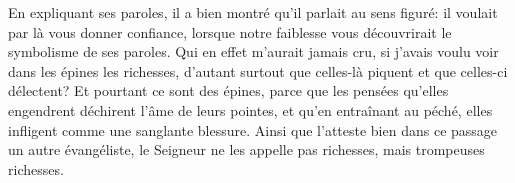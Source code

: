 En expliquant ses paroles, il a bien montré qu'il parlait au sens figuré:
	il voulait par là vous donner confiance,
	lorsque notre faiblesse vous découvrirait le symbolisme de ses paroles.
Qui en effet m'aurait jamais cru, si j'avais voulu voir dans les épines les richesses,
	d'autant surtout que celles-là piquent et que celles-ci délectent?
Et pourtant ce sont des épines,
	parce que les pensées qu'elles engendrent déchirent l'âme de leurs pointes,
	et qu'en entraînant au péché, elles infligent comme une sanglante blessure.
Ainsi que l'atteste bien dans ce passage un autre évangéliste,
	le Seigneur ne les appelle pas richesses, mais trompeuses richesses.
